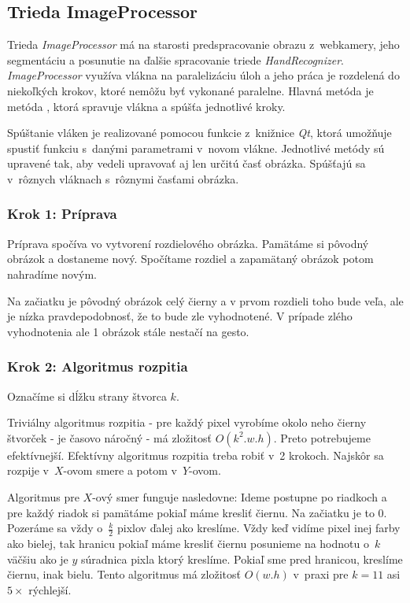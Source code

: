 \subsection{Trieda ImageProcessor}
Trieda \textit{ImageProcessor} má na starosti predspracovanie obrazu z~webkamery, jeho segmentáciu a posunutie na ďalšie spracovanie triede \textit{HandRecognizer}. \textit{ImageProcessor} využíva vlákna na paralelizáciu úloh a jeho práca je rozdelená do niekoľkých krokov, ktoré nemôžu byť vykonané paralelne. Hlavná metóda je metóda , ktorá spravuje vlákna a spúšťa jednotlivé kroky. 

Spúštanie vláken je realizované pomocou funkcie  z~knižnice \textit{Qt}, ktorá umožňuje spustiť funkciu s~danými parametrami v~novom vlákne. Jednotlivé metódy sú upravené tak, aby vedeli upravovať aj len určitú časť obrázka. Spúšťajú sa v~rôznych vláknach s~rôznymi časťami obrázka. %

\subsubsection{Krok 1: Príprava}
Príprava spočíva vo vytvorení rozdielového obrázka. Pamätáme si pôvodný obrázok a dostaneme nový. Spočítame rozdiel a zapamätaný obrázok potom nahradíme novým.

Na začiatku je pôvodný obrázok celý čierny a v prvom rozdieli toho bude veľa, ale je nízka pravdepodobnosť, že to bude zle vyhodnotené. V prípade zlého vyhodnotenia ale 1 obrázok stále nestačí na gesto.

\subsubsection{Krok 2: Algoritmus rozpitia}
Označíme si dĺžku strany štvorca $k$.

Triviálny algoritmus rozpitia - pre každý pixel vyrobíme okolo neho čierny štvorček - je časovo náročný - má zložitosť $O(k^2.w.h)$. Preto potrebujeme efektívnejší. 
Efektívny algoritmus rozpitia treba robiť v~2 krokoch. Najskôr sa rozpije v~$X$-ovom smere a potom v~$Y$-ovom.

Algoritmus pre $X$-ový smer funguje nasledovne: Ideme postupne po riadkoch a pre každý riadok si pamätáme pokiaľ máme kresliť čiernu.
Na začiatku je to 0. Pozeráme sa vždy o~$\frac{k}{2}$ pixlov ďalej ako kreslíme.
Vždy keď vidíme pixel inej farby ako bielej, tak hranicu pokiaľ máme kresliť čiernu posunieme na hodnotu o~$k$ väčšiu ako je $y$ súradnica pixla ktorý kreslíme. Pokiaľ sme pred hranicou, kreslíme čiernu, inak bielu. Tento algoritmus má zložitosť $O(w.h)$ v~praxi pre $k=11$ asi $5\times$ rýchlejší.  

